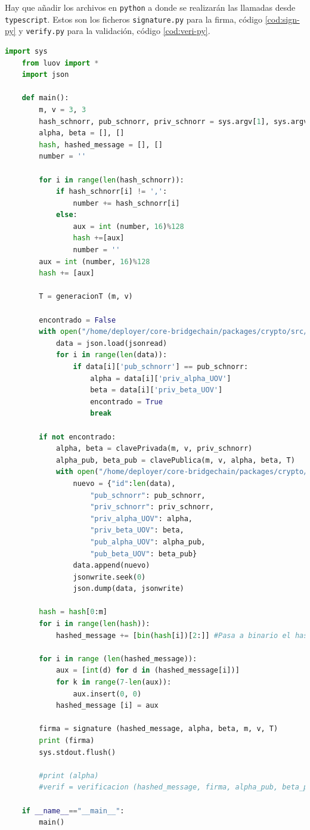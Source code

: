 Hay que añadir los archivos en \texttt{python} a donde se realizarán las llamadas desde \texttt{typescript}. Estos son los ficheros \texttt{signature.py} para la firma, código \ref{cod:sign-py} y \texttt{verify.py} para la validación, código \ref{cod:veri-py}.


\begin{lstlisting}[language=Python,caption=Archivo \texttt{signature.py}, label=cod:sign-py]
	import sys
	from luov import *
	import json

	def main():
		m, v = 3, 3
		hash_schnorr, pub_schnorr, priv_schnorr = sys.argv[1], sys.argv[2], sys.argv[3]
		alpha, beta = [], []
		hash, hashed_message = [], []
		number = ''

		for i in range(len(hash_schnorr)):
			if hash_schnorr[i] != ',':
				number += hash_schnorr[i]
			else:
				aux = int (number, 16)%128
				hash +=[aux]
				number = ''
		aux = int (number, 16)%128
		hash += [aux]

		T = generacionT (m, v)

		encontrado = False
		with open("/home/deployer/core-bridgechain/packages/crypto/src/crypto/data.json", "r") as jsonread:
			data = json.load(jsonread)
			for i in range(len(data)):
				if data[i]['pub_schnorr'] == pub_schnorr:
					alpha = data[i]['priv_alpha_UOV']
					beta = data[i]['priv_beta_UOV']
					encontrado = True
					break

		if not encontrado:
			alpha, beta = clavePrivada(m, v, priv_schnorr)
			alpha_pub, beta_pub = clavePublica(m, v, alpha, beta, T)
			with open("/home/deployer/core-bridgechain/packages/crypto/src/crypto/data.json", "w") as jsonwrite:
				nuevo = {"id":len(data),
					"pub_schnorr": pub_schnorr,
					"priv_schnorr": priv_schnorr,
					"priv_alpha_UOV": alpha,
					"priv_beta_UOV": beta,
					"pub_alpha_UOV": alpha_pub,
					"pub_beta_UOV": beta_pub}
				data.append(nuevo)
				jsonwrite.seek(0)
				json.dump(data, jsonwrite)

		hash = hash[0:m]
		for i in range(len(hash)):
			hashed_message += [bin(hash[i])[2:]] #Pasa a binario el hash

		for i in range (len(hashed_message)):
			aux = [int(d) for d in (hashed_message[i])]
			for k in range(7-len(aux)):
				aux.insert(0, 0)
			hashed_message [i] = aux

		firma = signature (hashed_message, alpha, beta, m, v, T)
		print (firma)
		sys.stdout.flush()

		#print (alpha)
		#verif = verificacion (hashed_message, firma, alpha_pub, beta_pub, m)

	if __name__=="__main__":
		main()
\end{lstlisting}


